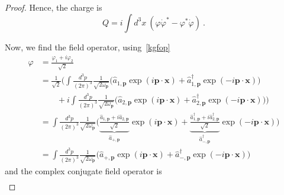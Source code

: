 \begin{proof}
        Hence, the charge is 
        \begin{equation*}   
            Q = i \int d^3 x ~(\varphi \dot \varphi^* - \varphi^* \dot \varphi) ~.
        \end{equation*}

        Now, we find the field operator, using~\eqref{kgfop} 
        \begin{equation*}
        \begin{aligned}
            \varphi & = \frac{\varphi_1 + i \varphi_2}{\sqrt{2}} \\ & = \frac{1}{\sqrt{2}} \Big (\int \frac{d^3 p}{{(2\pi)}^3} \frac{1}{\sqrt{2 \omega_{\mathbf p}}} \Big (\hat a_{1, \mathbf p} \exp(i \mathbf p \cdot \mathbf x) + \hat a_{1, \mathbf p}^\dagger \exp(- i \mathbf p \cdot \mathbf x) \Big) \\ & \qquad + i \int \frac{d^3 p}{{(2\pi)}^3} \frac{1}{\sqrt{2 \omega_{\mathbf p}}} \Big (\hat a_{2, \mathbf p} \exp(i \mathbf p \cdot \mathbf x) + \hat a_{2, \mathbf p}^\dagger \exp(- i \mathbf p \cdot \mathbf x) \Big) \Big) \\ & = \int \frac{d^3 p}{{(2\pi)}^3} \frac{1}{\sqrt{2 \omega_{\mathbf p}}} \Big ( \underbrace{\frac{\hat a_{1, \mathbf p} + i \hat a_{2, \mathbf p}}{\sqrt{2}}}_{\hat a_{+, \mathbf p}} \exp(i \mathbf p \cdot \mathbf x) + \underbrace{\frac{\hat a_{1, \mathbf p}^\dagger + i \hat a_{2, \mathbf p}^\dagger}{\sqrt{2}}}_{\hat a_{-, \mathbf p}^\dagger} \exp(- i \mathbf p \cdot \mathbf x) \Big) \\ & = \int \frac{d^3 p}{{(2\pi)}^3} \frac{1}{\sqrt{2 \omega_{\mathbf p}}} \Big ( \hat a_{+, \mathbf p} \exp(i \mathbf p \cdot \mathbf x) + \hat a_{-, \mathbf p}^\dagger \exp(- i \mathbf p \cdot \mathbf x) \Big) 
        \end{aligned}
        \end{equation*}
        and the complex conjugate field operator is
        \begin{equation*}
        \begin{aligned}

\end{aligned}
\end{equation*}
\end{proof}
